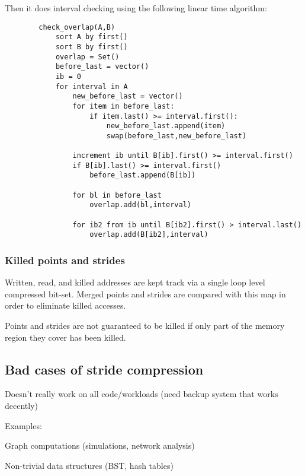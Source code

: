 \documentclass[12pt,twoside]{reedthesis}
\begin{document}
		Then it does interval checking using the following linear time algorithm:
		
		\begin{verbatim}
		check_overlap(A,B)
		    sort A by first()
		    sort B by first()
		    overlap = Set()
		    before_last = vector()
		    ib = 0
		    for interval in A
		        new_before_last = vector()
		        for item in before_last:
		            if item.last() >= interval.first():
		                new_before_last.append(item)
		                swap(before_last,new_before_last)
		
		        increment ib until B[ib].first() >= interval.first()
		        if B[ib].last() >= interval.first()
		            before_last.append(B[ib])
		
		        for bl in before_last
		            overlap.add(bl,interval)
		
		        for ib2 from ib until B[ib2].first() > interval.last()
		            overlap.add(B[ib2],interval)
		\end{verbatim}
		
		\subsubsection{Killed points and strides}
		
		Written, read, and killed addresses are kept track via a single loop level compressed bit-set. Merged points and strides are compared with this map in order to eliminate killed accesses. 
		
		Points and strides are not guaranteed to be killed if only part of the memory region they cover has been killed. 
		
		\subsection{Bad cases of stride compression}
		
		Doesn’t really work on all code/workloads (need backup system that works decently)
		
		Examples:
		
		Graph computations (simulations, network analysis)
		
		Non-trivial data structures (BST, hash tables)
		
		
\end{document}

